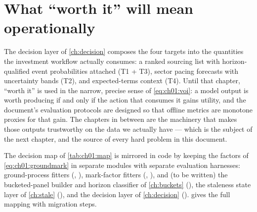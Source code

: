 \section{What ``worth it'' will mean operationally}\label{ch01:sec:operational}

The decision layer of \cref{ch:decision} composes the four targets into the
quantities the investment workflow actually consumes: a ranked sourcing
list with horizon-qualified event probabilities attached (T1 + T3), sector
pacing forecasts with uncertainty bands (T2), and expected-terms context
(T4). Until that chapter, ``worth it'' is used in the narrow, precise
sense of \cref{eq:ch01:voi}: a model output is worth producing if and only
if the action that consumes it gains utility, and the document's evaluation
protocols are designed so that offline metrics are monotone proxies for
that gain. The chapters in between are the machinery that makes those
outputs trustworthy on the data we actually have --- which is the subject
of the next chapter, and the source of every hard problem in this
document.

\begin{codehooks}
The decision map of \cref{tab:ch01:map} is mirrored in code by keeping the
factors of \cref{eq:ch01:groundmark} in separate modules with separate
evaluation harnesses: ground-process fitters (,
), mark-factor fitters (,
), and (to be written) the bucketed-panel
builder and horizon classifier of \cref{ch:buckets}
(), the staleness state layer of \cref{ch:stale}
(), and the decision layer of \cref{ch:decision}
().  gives the full mapping with
migration steps.
\end{codehooks}
